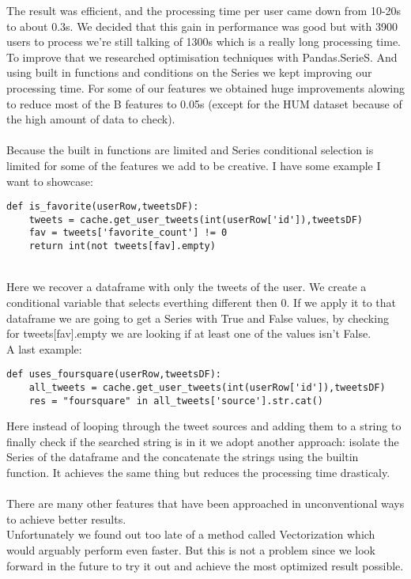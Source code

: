 \documentclass[a4paper,11pt]{article}
\begin{document}
The result was efficient, and the processing time per user came down from 10-20s to about 0.3s. We decided that this gain in performance was good but with 3900 users to process we're still talking of 1300s which is a really long processing time. To improve that we researched optimisation techniques with Pandas.SerieS. And using built in functions and conditions on the Series we kept improving our processing time. For some of our features we obtained huge improvements alowing to reduce most of the B features to 0.05s (except for the HUM dataset because of the high amount of data to check).\\\\

Because the built in functions are limited and Series conditional selection is limited for some of the features we add to be creative. I have some example I want to showcase:

\begin{verbatim}
def is_favorite(userRow,tweetsDF):
	tweets = cache.get_user_tweets(int(userRow['id']),tweetsDF)
	fav = tweets['favorite_count'] != 0
	return int(not tweets[fav].empty)
\end{verbatim}
\\Here we recover a dataframe with only the tweets of the user. We create a conditional variable that selects everthing different then 0. If we apply it to that dataframe we are going to get a Series with True and False values, by checking for tweets[fav].empty we are looking if at least one of the values isn't False.
\\ A last example: 
\begin{verbatim}
def uses_foursquare(userRow,tweetsDF):
	all_tweets = cache.get_user_tweets(int(userRow['id']),tweetsDF)
	res = "foursquare" in all_tweets['source'].str.cat()
\end{verbatim}
Here instead of looping through the tweet sources and adding them to a string to finally check if the searched string is in it we adopt another approach: isolate the Series of the dataframe and the concatenate the strings using the builtin function. It achieves the same thing but reduces the processing time drasticaly.\\\\

There are many other features that have been approached in unconventional ways to achieve better results. \\

Unfortunately we found out too late of a method called Vectorization which would arguably perform even faster. But this is not a problem since we look forward in the future to try it out and achieve the most optimized result possible.
\end{document}
